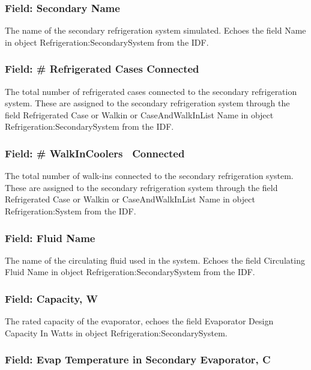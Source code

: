 \subsubsection{Field: Secondary Name}\label{field-secondary-name}

The name of the secondary refrigeration system simulated. Echoes the field Name in object Refrigeration:SecondarySystem from the IDF.

\subsubsection{Field: \# Refrigerated Cases Connected}\label{field-refrigerated-cases-connected-2}

The total number of refrigerated cases connected to the secondary refrigeration system. These are assigned to the secondary refrigeration system through the field Refrigerated Case or Walkin or CaseAndWalkInList Name in object Refrigeration:SecondarySystem from the IDF.

\subsubsection{Field: \# WalkInCoolers~ Connected}\label{field-walkincoolers-connected-2}

The total number of walk-ins connected to the secondary refrigeration system. These are assigned to the secondary refrigeration system through the field Refrigerated Case or Walkin or CaseAndWalkInList Name in object Refrigeration:System from the IDF.

\subsubsection{Field: Fluid Name}\label{field-fluid-name}

The name of the circulating fluid used in the system. Echoes the field Circulating Fluid Name in object Refrigeration:SecondarySystem from the IDF.

\subsubsection{Field: Capacity, W}\label{field-capacity-w}

The rated capacity of the evaporator, echoes the field Evaporator Design Capacity In Watts in object Refrigeration:SecondarySystem.

\subsubsection{Field: Evap Temperature in Secondary Evaporator, C}\label{field-evap-temperature-in-secondary-evaporator-c}

